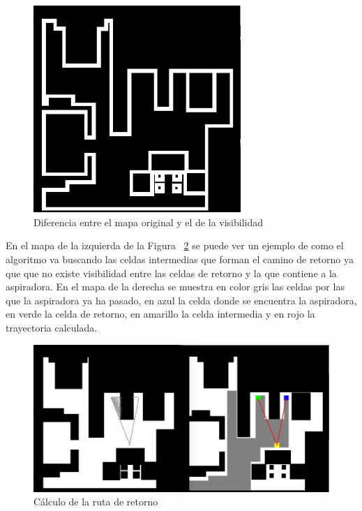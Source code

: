 \begin{figure}[H]
  \begin{center}
    \includegraphics[width=0.7\textwidth]{figures/Vacuum/diffVis.png}
		\caption{Diferencia entre el mapa original y el de la visibilidad}
		\label{fig.diffVis}
		\end{center}
\end{figure}


En el mapa de la izquierda de la Figura  ~\ref{fig.rutaRet} se puede ver un ejemplo de como el algoritmo va buscando las celdas intermedias que forman el camino de retorno ya que que no existe visibilidad entre las celdas de retorno y la que contiene a la aspiradora. En el mapa de la derecha se muestra en color gris las celdas por las que la aspiradora ya ha pasado, en azul la celda donde se encuentra la aspiradora, en verde la celda de retorno, en amarillo la celda intermedia y en rojo la trayectoria calculada.\\

\begin{figure}[H]
  \begin{center}
    \includegraphics[width=1.0\textwidth]{figures/Vacuum/visibilidadEntreDosPuntos.png}
		\caption{Cálculo de la ruta de retorno}
		\label{fig.rutaRet}
		\end{center}
\end{figure}

